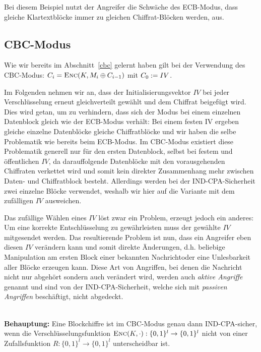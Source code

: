 Bei diesem Beispiel nutzt der Angreifer die Schwäche des ECB-Modus, dass gleiche Klartextblöcke immer zu gleichen Chiffrat-Blöcken werden, aus.

\subsection{CBC-Modus}

Wie wir bereits im Abschnitt~\ref{cbc} gelernt haben gilt bei der Verwendung des CBC-Modus: $C_i = \textsc{Enc}(K, M_i \oplus C_{i-1})$ mit
$C_0 := IV$.

Im Folgenden nehmen wir an, dass der Initialisierungsvektor $IV$ bei jeder Verschlüsselung erneut gleichverteilt gewählt und dem Chiffrat beigefügt wird. Dies
wird getan, um zu verhindern, dass sich der Modus bei einem einzelnen Datenblock gleich wie der ECB-Modus verhält: Bei einem festen IV ergeben gleiche einzelne
Datenblöcke gleiche Chiffratblöcke und wir haben die selbe Problematik wie bereits beim ECB-Modus. Im CBC-Modus existiert diese Problematik generell nur für
den ersten Datenblock, selbst bei festem und öffentlichen $IV$, da darauffolgende Datenblöcke mit den vorausgehenden Chiffraten verkettet wird und somit kein
direkter Zusammenhang mehr zwischen Daten- und Chiffratblock besteht. Allerdings werden bei der IND-CPA-Sicherheit zwei einzelne Blöcke verwendet, weshalb wir
hier auf die Variante mit dem zufälligen $IV$ ausweichen.

Das zufällige Wählen eines $IV$ löst zwar ein Problem, erzeugt jedoch ein anderes: Um eine korrekte Entschlüsselung zu gewährleisten muss der gewählte $IV$
mitgesendet werden. Das resultierende Problem ist nun, dass ein Angreifer eben diesen $IV$ verändern kann und somit \glqq direkte Änderungen\grqq, d.h.
beliebige Manipulation am ersten Block einer bekannten Nachrichtoder eine Unlesbarkeit aller Blöcke erzeugen kann. Diese Art von Angriffen, bei denen die
Nachricht nicht nur abgehört sondern auch verändert wird, werden auch \emph{aktive Angriffe} 
genannt und sind von der IND-CPA-Sicherheit, welche sich mit \emph{passiven Angriffen} beschäftigt, nicht abgedeckt.

~\\
\textbf{Behauptung:} Eine Blockchiffre ist im CBC-Modus genau dann IND-CPA-sicher, wenn die Verschlüsselungsfunktion $\textsc{Enc}(K,\cdot) : \{0,1\}^l \rightarrow
\{0,1\}^l$ nicht von einer Zufallsfunktion $R: \{0,1\}^l \rightarrow \{0,1\}^l$ unterscheidbar ist.

